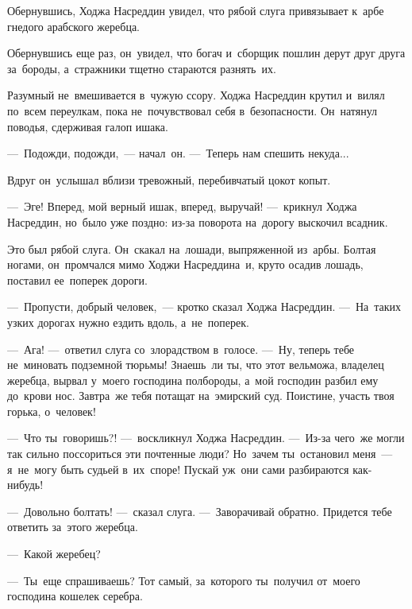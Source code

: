 \documentclass[12pt,a4paper]{book}
\begin{document}
Обернувшись, Ходжа Насреддин увидел, что рябой слуга привязывает к~арбе гнедого арабского жеребца.

Обернувшись еще раз, он~увидел, что богач и~сборщик пошлин дерут друг друга за~бороды, а~стражники тщетно стараются разнять~их.

Разумный не~вмешивается в~чужую ссору. Ходжа Насреддин крутил и~вилял по~всем переулкам, пока не~почувствовал себя в~безопасности. Он~натянул поводья, сдерживая галоп ишака.

—~Подожди, подожди,~— начал~он. —~Теперь нам спешить некуда...

Вдруг он~услышал вблизи тревожный, перебивчатый цокот копыт.

—~Эге! Вперед, мой верный ишак, вперед, выручай! —~крикнул Ходжа Насреддин, но~было уже поздно: из-за поворота на~дорогу выскочил всадник.

Это был рябой слуга. Он~скакал на~лошади, выпряженной из~арбы. Болтая ногами, он~промчался мимо Ходжи Насреддина~и, круто осадив лошадь, поставил ее~поперек дороги.

—~Пропусти, добрый человек,~— кротко сказал Ходжа Насреддин. —~На~таких узких дорогах нужно ездить вдоль, а~не~поперек.

—~Ага! —~ответил слуга со~злорадством в~голосе. —~Ну, теперь тебе не~миновать подземной тюрьмы! Знаешь~ли ты, что этот вельможа, владелец жеребца, вырвал у~моего господина полбороды, а~мой господин разбил ему до~крови нос. Завтра~же тебя потащат на~эмирский суд. Поистине, участь твоя горька, о~человек!

—~Что ты~говоришь?! —~воскликнул Ходжа Насреддин. —~Из-за чего~же могли так сильно поссориться эти почтенные люди? Но~зачем ты~остановил меня~— я~не~могу быть судьей в~их~споре! Пускай уж~они сами разбираются как-нибудь!

—~Довольно болтать! —~сказал слуга. —~Заворачивай обратно. Придется тебе ответить за~этого жеребца.

—~Какой жеребец?

—~Ты~еще спрашиваешь? Тот самый, за~которого ты~получил от~моего господина кошелек серебра.
\end{document}
